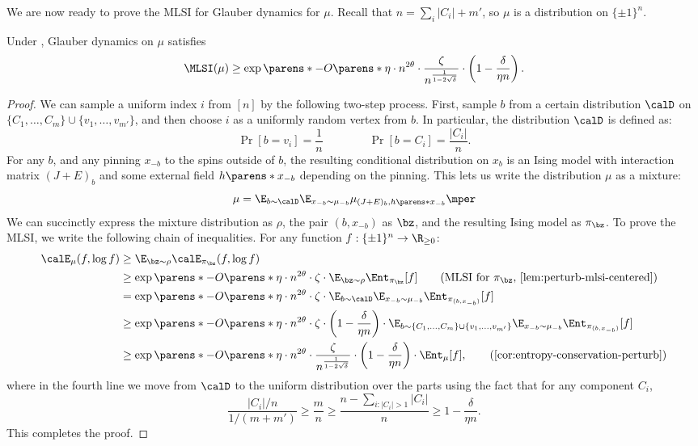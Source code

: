 \documentclass[11pt,letterpaper]{article}
\begin{document}
We are now ready to prove the MLSI for Glauber dynamics for $\mu$. Recall that $n = \sum_{i}|C_i| + m'$, so $\mu$ is a distribution on $\{\pm1\}^n$.
\begin{lemma}\label{lem:mlsi-under-assumptions}
    Under , Glauber dynamics on $\mu$ satisfies
    \[
        \MLSI(\mu) \ge \exp\parens*{-O\parens*{\eta \cdot n^{2\theta}}} \cdot \frac{\zeta}{n^{\frac{1}{1-2\sqrt{\delta}}}} \cdot \left(1 - \frac{\delta}{\eta n}\right).
    \]
\end{lemma}
\begin{proof}
    We can sample a uniform index $i$ from $[n]$ by the following two-step process. First, sample $b$ from a certain distribution $\calD$ on $\{C_1,\dots,C_m\}\cup\{v_1,\dots,v_{m'}\}$, and then choose $i$ as a uniformly random vertex from $b$. In particular, the distribution $\calD$ is defined as:
    \[
        \Pr[b = v_i] = \frac{1}{n} \qquad \qquad \Pr[b = C_i] = \frac{|C_i|}{n}.
    \]
    For any $b$, and any pinning $x_{-b}$ to the spins outside of $b$, the resulting conditional distribution on $x_b$ is an Ising model with interaction matrix $(J+E)_b$ and some external field $h\parens*{x_{-b}}$ depending on the pinning.
    This lets us write the distribution $\mu$ as a mixture:
    \[
        \mu = \E_{b\sim\calD} \E_{x_{-b}\sim\mu_{-b}} \mu_{(J+E)_b, h\parens*{x_{-b}}}\mper
    \]
    We can succinctly express the mixture distribution as $\rho$, the pair $(b, x_{-b})$ as $\bz$, and the resulting Ising model as $\pi_{\bz}$.
    To prove the MLSI, we write the following chain of inequalities.
    For any function $f:\{\pm1\}^n\to\R_{\ge 0}$:
    \begin{align*}
        \calE_{\mu}(f, \log f) &\ge \E_{\bz\sim\rho} \calE_{\pi_{\bz}}(f, \log f) \\
        &\ge \exp\parens*{-O\parens*{\eta \cdot n^{2\theta}}} \cdot \zeta \cdot \E_{\bz\sim\rho} \Ent_{\pi_{\bz}}[f] \tag*{\text{(MLSI for $\pi_{\bz}$, \Cref{lem:perturb-mlsi-centered})}}\\
        &= \exp\parens*{-O\parens*{\eta \cdot n^{2\theta}}} \cdot \zeta \cdot \E_{b\sim\calD} \E_{x_{-b}\sim\mu_{-b}} \Ent_{\pi_{(b,x_{-b})}}[f] \\
        &\ge \exp\parens*{-O\parens*{\eta \cdot n^{2\theta}}} \cdot \zeta \cdot \left(1 - \frac{\delta}{\eta n}\right) \cdot \E_{b\sim\{C_1,\dots,C_m\}\cup\{v_1,\dots,v_{m'}\}} \E_{x_{-b}\sim\mu_{-b}} \Ent_{\pi_{(b,x_{-b})}}[f] \\
        &\ge \exp\parens*{-O\parens*{\eta \cdot n^{2\theta}}} \cdot \frac{\zeta}{n^{\frac{1}{1-2\sqrt{\delta}}}} \cdot \left(1 - \frac{\delta}{\eta n}\right) \cdot \Ent_{\mu}[f],  \tag*{(\Cref{cor:entropy-conservation-perturb})}
    \end{align*}
    where in the fourth line we move from $\calD$ to the uniform distribution over the parts using the fact that for any component $C_i$,
    \[ \frac{|C_i|/n}{1/(m+m')} \ge \frac{m}{n} \ge \frac{n - \sum_{i : |C_i| > 1} |C_i|}{n} \ge 1 - \frac{\delta}{\eta n}. \]
    This completes the proof.
\end{proof}
\end{document}
